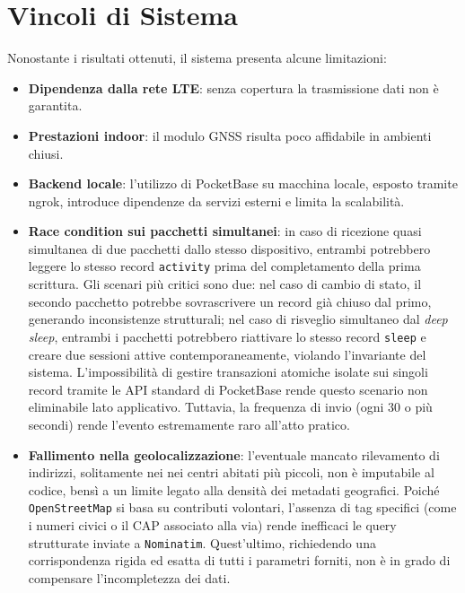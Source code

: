 \documentclass[12pt,a4paper]{article}
\begin{document}
\section{Vincoli di Sistema}
Nonostante i risultati ottenuti, il sistema presenta alcune limitazioni:
\begin{itemize}
    \item \textbf{Dipendenza dalla rete LTE}: senza copertura la trasmissione dati non è garantita.
    \item \textbf{Prestazioni indoor}: il modulo GNSS risulta poco affidabile in ambienti chiusi.
    \item \textbf{Backend locale}: l'utilizzo di PocketBase su macchina locale, 
        esposto tramite ngrok, introduce dipendenze da servizi esterni e limita la scalabilità.
    \item \textbf{Race condition sui pacchetti simultanei}: in caso di ricezione 
        quasi simultanea di due pacchetti dallo stesso dispositivo, 
        entrambi potrebbero leggere lo stesso record \texttt{activity} 
        prima del completamento della prima scrittura. 
        Gli scenari più critici sono due: 
        nel caso di cambio di stato, il secondo pacchetto potrebbe sovrascrivere 
        un record già chiuso dal primo, generando inconsistenze strutturali; 
        nel caso di risveglio simultaneo dal \textit{deep sleep}, 
        entrambi i pacchetti potrebbero riattivare 
        lo stesso record \texttt{sleep} e creare due sessioni attive 
        contemporaneamente, violando l'invariante del sistema. 
        L'impossibilità di gestire transazioni atomiche isolate 
        sui singoli record tramite le API standard di PocketBase 
        rende questo scenario non eliminabile lato applicativo. 
        Tuttavia, la frequenza di invio (ogni 30 o più secondi) 
        rende l’evento estremamente raro all'atto pratico.
    \item \textbf{Fallimento nella geolocalizzazione}: l'eventuale mancato rilevamento 
        di indirizzi, solitamente nei nei centri abitati più piccoli, 
        non è imputabile al codice, bensì a un limite legato alla densità dei metadati geografici. 
        Poiché \texttt{OpenStreetMap} si basa su contributi volontari, 
        l'assenza di tag specifici (come i numeri civici o il CAP associato alla via) 
        rende inefficaci le query strutturate inviate a \texttt{Nominatim}. 
        Quest'ultimo, richiedendo una corrispondenza rigida ed esatta di tutti i parametri forniti, 
        non è in grado di compensare l'incompletezza dei dati.
\end{itemize}
\end{document}
